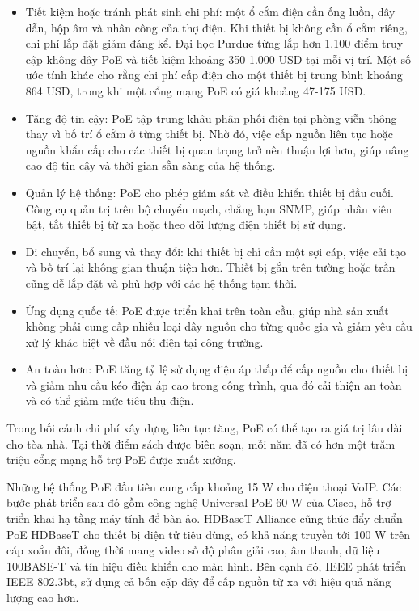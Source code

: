 \documentclass{thesis}
\begin{document}
\begin{itemize}
  \item Tiết kiệm hoặc tránh phát sinh chi phí: một ổ cắm điện cần
    ống luồn, dây dẫn, hộp âm và nhân công của thợ điện. Khi thiết bị
    không cần ổ cắm riêng, chi phí lắp đặt giảm đáng kể. Đại học
    Purdue từng lắp hơn 1.100 điểm truy cập không dây PoE và tiết
    kiệm khoảng 350-1.000 USD tại mỗi vị trí. Một số ước tính khác
    cho rằng chi phí cấp điện cho một thiết bị trung bình khoảng 864
    USD, trong khi một cổng mạng PoE có giá khoảng 47-175 USD.
  \item Tăng độ tin cậy: PoE tập trung khâu phân phối điện tại phòng
    viễn thông thay vì bố trí ổ cắm ở từng thiết bị. Nhờ đó, việc cấp
    nguồn liên tục hoặc nguồn khẩn cấp cho các thiết bị quan trọng
    trở nên thuận lợi hơn, giúp nâng cao độ tin cậy và thời gian sẵn
    sàng của hệ thống.
  \item Quản lý hệ thống: PoE cho phép giám sát và điều khiển thiết bị
    đầu cuối. Công cụ quản trị trên bộ chuyển mạch, chẳng hạn SNMP,
    giúp nhân viên bật, tắt thiết bị từ xa hoặc theo dõi lượng điện
    thiết bị sử dụng.
  \item Di chuyển, bổ sung và thay đổi: khi thiết bị chỉ cần một sợi
    cáp, việc cải tạo và bố trí lại không gian thuận tiện hơn. Thiết
    bị gắn trên tường hoặc trần cũng dễ lắp đặt và phù hợp với các hệ
    thống tạm thời.
  \item Ứng dụng quốc tế: PoE được triển khai trên toàn cầu, giúp nhà
    sản xuất không phải cung cấp nhiều loại dây nguồn cho từng quốc
    gia và giảm yêu cầu xử lý khác biệt về đầu nối điện tại công trường.
  \item An toàn hơn: PoE tăng tỷ lệ sử dụng điện áp thấp để cấp nguồn
    cho thiết bị và giảm nhu cầu kéo điện áp cao trong công trình,
    qua đó cải thiện an toàn và có thể giảm mức tiêu thụ điện.
\end{itemize}

Trong bối cảnh chi phí xây dựng liên tục tăng, PoE có thể tạo ra giá
trị lâu dài cho tòa nhà. Tại thời điểm sách được biên soạn, mỗi năm
đã có hơn một trăm triệu cổng mạng hỗ trợ PoE được xuất xưởng.

Những hệ thống PoE đầu tiên cung cấp khoảng 15 W cho điện thoại VoIP.
Các bước phát triển sau đó gồm công nghệ Universal PoE 60 W của
Cisco, hỗ trợ triển khai hạ tầng máy tính để bàn ảo. HDBaseT Alliance
cũng thúc đẩy chuẩn PoE HDBaseT cho thiết bị điện tử tiêu dùng, có
khả năng truyền tới 100 W trên cáp xoắn đôi, đồng thời mang video số
độ phân giải cao, âm thanh, dữ liệu 100BASE-T và tín hiệu điều khiển
cho màn hình. Bên cạnh đó, IEEE phát triển IEEE 802.3bt, sử dụng cả
bốn cặp dây để cấp nguồn từ xa với hiệu quả năng lượng cao hơn.
\end{document}
